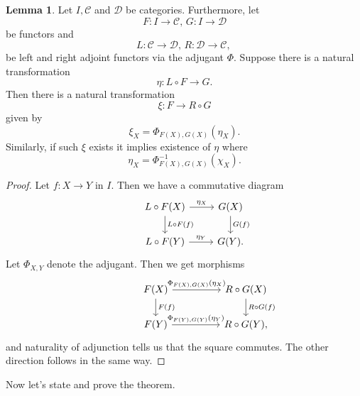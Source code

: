 \documentclass{article}
\theoremstyle{definition}
\newtheorem{lemma}[theorem]{Lemma}
\begin{document}
\begin{lemma}
	Let $I, \mathcal{C}$ and $\mathcal{D}$ be categories.
	Furthermore, let
	\[
		F : I \to \mathcal{C}, \,
		G : I \to \mathcal{D}
	\]
	be functors and 
	\[
		L : \mathcal{C} \to \mathcal{D}, \,
		R : \mathcal{D} \to \mathcal{C}, \,
	\] 
	be left and right adjoint functors via the adjugant $\Phi$. Suppose there
	is a natural transformation
	\[
		\eta : L \circ F \to G.
	\] 
	Then there is a natural transformation 
	\[
		\xi : F \to R \circ G
	\] 
	given by
	\[
		\xi_X = \Phi_{F(X), G(X)}(\eta_X).
	\] 
	Similarly, if such $\xi$ exists it implies existence of $\eta$ where
	\[
		\eta_X = \Phi^{-1}_{F(X), G(X)}(\chi_X).
	\] 
\end{lemma}
\begin{proof}
	Let $f : X \to Y$ in $I$. Then we have a commutative diagram 
	\[
	\begin{tikzcd}
		& L \circ F(X)
		\arrow{r}{\eta_{X}}
		\arrow{d}{L \circ F(f)}
		& G(X)
		\arrow{d}{G(f)} \\
		& L \circ F(Y)
		\arrow{r}{\eta_{Y}}
		& G(Y).
	\end{tikzcd}
	\] 
	Let $\Phi_{X, Y}$ denote the adjugant. Then we get morphisms
	\[
	\begin{tikzcd}[column sep = huge]
		& F(X)
		\arrow{r}{\Phi_{F(X), G(X)}(\eta_{X})}
		\arrow{d}{F(f)}
		& R \circ G(X)
		\arrow{d}{R \circ G(f)} \\
		& F(Y)
		\arrow{r}{\Phi_{F(Y), G(Y)}(\eta_{Y})}
		& R \circ G(Y),
	\end{tikzcd}
	\]
	and naturality of adjunction tells us that the square commutes. The other
	direction follows in the same way.
\end{proof}

Now let's state and prove the theorem.
\end{document}
